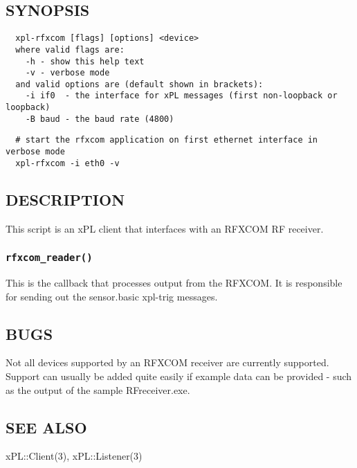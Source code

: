 \subsection*{SYNOPSIS\label{xpl-rfxcom_SYNOPSIS}}
\begin{verbatim}
  xpl-rfxcom [flags] [options] <device>
  where valid flags are:
    -h - show this help text
    -v - verbose mode
  and valid options are (default shown in brackets):
    -i if0  - the interface for xPL messages (first non-loopback or loopback)
    -B baud - the baud rate (4800)
\end{verbatim}
\begin{verbatim}
  # start the rfxcom application on first ethernet interface in verbose mode
  xpl-rfxcom -i eth0 -v
\end{verbatim}
\subsection*{DESCRIPTION\label{xpl-rfxcom_DESCRIPTION}}


This script is an xPL client that interfaces with an RFXCOM RF receiver.

\subsubsection*{\texttt{rfxcom\_reader()}\label{xpl-rfxcom_rfxcom_reader_}}


This is the callback that processes output from the RFXCOM.  It is
responsible for sending out the sensor.basic xpl-trig messages.

\subsection*{BUGS\label{xpl-rfxcom_BUGS}}


Not all devices supported by an RFXCOM receiver are currently
supported.  Support can usually be added quite easily if example data
can be provided - such as the output of the sample RFreceiver.exe.

\subsection*{SEE ALSO\label{xpl-rfxcom_SEE_ALSO}}


xPL::Client(3), xPL::Listener(3)



